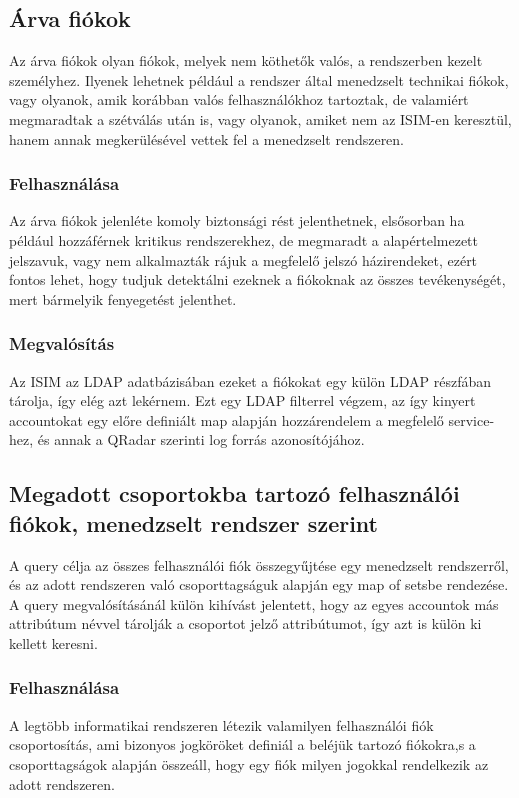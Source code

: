 \subsection{Árva fiókok } \label{lbl:orphanaccs}
Az árva fiókok olyan fiókok, melyek nem köthetők valós, a rendszerben kezelt személyhez. Ilyenek lehetnek például a rendszer által menedzselt technikai fiókok, vagy olyanok, amik korábban valós felhasználókhoz tartoztak, de valamiért megmaradtak a szétválás után is, vagy olyanok, amiket nem az ISIM-en keresztül, hanem annak megkerülésével vettek fel a menedzselt rendszeren. 
	\subsubsection{Felhasználása}
 	Az árva fiókok jelenléte komoly biztonsági rést jelenthetnek, elsősorban ha például hozzáférnek kritikus rendszerekhez, de megmaradt a alapértelmezett jelszavuk, vagy nem alkalmazták rájuk a megfelelő jelszó házirendeket, ezért fontos lehet, hogy tudjuk detektálni ezeknek a fiókoknak az összes tevékenységét, mert bármelyik fenyegetést jelenthet.
	\subsubsection{Megvalósítás}
	Az ISIM az LDAP adatbázisában ezeket a fiókokat egy külön LDAP részfában tárolja, így elég azt lekérnem. Ezt egy LDAP filterrel végzem, az így kinyert accountokat egy előre definiált map alapján hozzárendelem a megfelelő service-hez, és annak a QRadar szerinti log forrás azonosítójához.
	
\subsection{Megadott csoportokba tartozó felhasználói fiókok, menedzselt rendszer szerint}		
A query célja az összes felhasználói fiók összegyűjtése egy menedzselt rendszerről, és az adott rendszeren való csoporttagságuk alapján egy map of setsbe rendezése. A query megvalósításánál külön kihívást jelentett, hogy az egyes accountok más attribútum névvel tárolják a csoportot jelző attribútumot, így azt is külön ki kellett keresni.
	\subsubsection{Felhasználása}
		A legtöbb informatikai rendszeren létezik valamilyen felhasználói fiók csoportosítás, ami bizonyos jogköröket definiál a beléjük tartozó fiókokra,s a csoporttagságok alapján összeáll, hogy egy fiók milyen jogokkal rendelkezik az adott rendszeren. 
		
